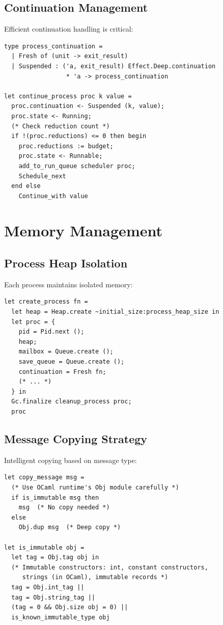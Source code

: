 \documentclass[12pt,a4paper]{report}
\begin{document}
\subsection{Continuation Management}

Efficient continuation handling is critical:

\begin{lstlisting}
type process_continuation =
  | Fresh of (unit -> exit_result)
  | Suspended : ('a, exit_result) Effect.Deep.continuation 
                 * 'a -> process_continuation

let continue_process proc k value =
  proc.continuation <- Suspended (k, value);
  proc.state <- Running;
  (* Check reduction count *)
  if !(proc.reductions) <= 0 then begin
    proc.reductions := budget;
    proc.state <- Runnable;
    add_to_run_queue scheduler proc;
    Schedule_next
  end else
    Continue_with value
\end{lstlisting}

\section{Memory Management}

\subsection{Process Heap Isolation}

Each process maintains isolated memory:

\begin{lstlisting}
let create_process fn =
  let heap = Heap.create ~initial_size:process_heap_size in
  let proc = {
    pid = Pid.next ();
    heap;
    mailbox = Queue.create ();
    save_queue = Queue.create ();
    continuation = Fresh fn;
    (* ... *)
  } in
  Gc.finalize cleanup_process proc;
  proc
\end{lstlisting}

\subsection{Message Copying Strategy}

Intelligent copying based on message type:

\begin{lstlisting}
let copy_message msg =
  (* Use OCaml runtime's Obj module carefully *)
  if is_immutable msg then
    msg  (* No copy needed *)
  else
    Obj.dup msg  (* Deep copy *)

let is_immutable obj =
  let tag = Obj.tag obj in
  (* Immutable constructors: int, constant constructors, 
     strings (in OCaml), immutable records *)
  tag = Obj.int_tag || 
  tag = Obj.string_tag ||
  (tag = 0 && Obj.size obj = 0) ||
  is_known_immutable_type obj
\end{lstlisting}
\end{document}

